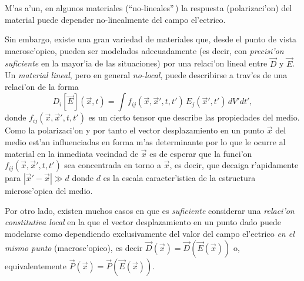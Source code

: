 M'as a'un, en algunos materiales (``no-lineales''\,) la respuesta
(polarizaci'on) del material puede depender no-linealmente del campo el'ectrico.

Sin embargo, existe una gran variedad de materiales que, desde el punto de
vista macrosc'opico, pueden ser modelados adecuadamente (es decir, con \textit{precisi'on suficiente} en la mayor'ia de las situaciones) por una relaci'on lineal entre $\vec{D}$ y $\vec{E}$. Un \textit{material lineal}, pero en general \textit{no-local}, puede describirse a
trav'es de una relaci'on de la forma
\begin{equation}
D_i[\vec{E}](\vec{x},t)=\int
f_{ij}(\vec{x},\vec{x}',t,t')\,{E}_j(\vec{x}',t')\,dV' dt',
\end{equation}
donde $f_{ij}(\vec{x},\vec{x}',t,t')$ es un cierto tensor que describe las
propiedades del medio. Como la polarizaci'on y por tanto el vector
desplazamiento en un punto $\vec{x}$ del medio est'an influenciadas en forma
m'as determinante por lo que le ocurre al material en la inmediata vecindad de
$\vec{x}$ es de esperar que la funci'on $f_{ij}(\vec{x},\vec{x}',t,t')$ sea
concentrada en torno a $\vec{x}$, es decir, que decaiga r'apidamente para
$|\vec{x}'-\vec{x}|\gg d$ donde $d$ es la escala caracter'istica de la
estructura microsc'opica del medio.

Por otro lado, existen muchos casos en que es \textit{suficiente} considerar una
\textit{relaci'on constitutiva local} en la que el vector desplazamiento en un
punto dado puede modelarse como dependiendo exclusivamente del valor del campo
el'ectrico \textit{en el mismo punto} (macrosc'opico), es decir
$\vec{D}(\vec{x})=\vec{D}(\vec{E}(\vec{x}))$ o, equivalentemente
$\vec{P}(\vec{x})=\vec{P}(\vec{E}(\vec{x}))$.

